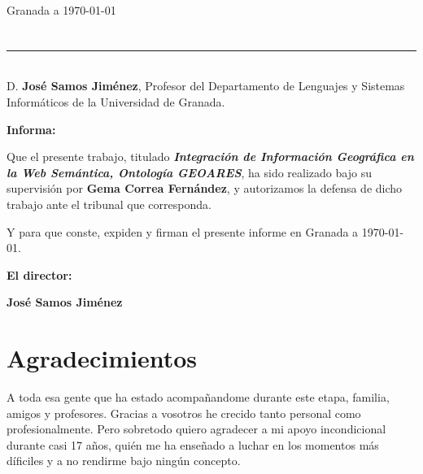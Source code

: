 \vspace{2cm}

\begin{flushright}
Granada a \today
\end{flushright}


\chapter*{}
\thispagestyle{empty}

\noindent\rule[-1ex]{\textwidth}{2pt}\\[4.5ex]

D. \textbf{José Samos Jiménez}, Profesor del Departamento de Lenguajes y Sistemas Informáticos de la Universidad de Granada.

\vspace{0.5cm}

\textbf{Informa:}

\vspace{0.5cm}

Que el presente trabajo, titulado \textit{\textbf{Integración de Información Geográfica en la Web Semántica, Ontología GEOARES}},
ha sido realizado bajo su supervisión por \textbf{Gema Correa Fernández}, y autorizamos la defensa de dicho trabajo ante el tribunal que corresponda.

\vspace{0.5cm}

Y para que conste, expiden y firman el presente informe en Granada a \today.

\vspace{1cm}

\textbf{El director:}

\vspace{5cm}

\noindent \textbf{José Samos Jiménez}

\chapter*{Agradecimientos}
\thispagestyle{empty}

       \vspace{1cm}
       
 A toda esa gente que ha estado acompañandome durante este etapa, familia, amigos y profesores. Gracias a vosotros he crecido tanto personal como profesionalmente. Pero sobretodo quiero agradecer a mi apoyo incondicional durante casi 17 años, quién me ha enseñado a luchar en los momentos más díficiles y a no rendirme bajo ningún concepto.\\






